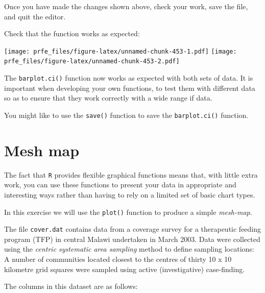\documentclass[12pt,a4paper]{book}
\newenvironment{Shaded}{\begin{snugshade}}{\end{snugshade}}
\newcommand{\KeywordTok}[1]{\textcolor[rgb]{0.13,0.29,0.53}{\textbf{#1}}}
\newcommand{\NormalTok}[1]{#1}
\newcommand{\OperatorTok}[1]{\textcolor[rgb]{0.81,0.36,0.00}{\textbf{#1}}}
\theoremstyle{definition}
\theoremstyle{definition}
\theoremstyle{definition}
\theoremstyle{remark}
\begin{document}
Once you have made the changes shown above, check your work, save the
file, and quit the editor.

Check that the function works as expected:

\begin{Shaded}
\end{Shaded}

\texttt{[image: prfe\_files/figure-latex/unnamed-chunk-453-1.pdf]}
\texttt{[image: prfe\_files/figure-latex/unnamed-chunk-453-2.pdf]}

The \texttt{barplot.ci()} function now works as expected with both sets
of data. It is important when developing your own functions, to test
them with different data so as to ensure that they work correctly with a
wide range if data.

You might like to use the \texttt{save()} function to save the
\texttt{barplot.ci()} function.

\hypertarget{mesh-map}{%
\section{Mesh map}\label{mesh-map}}

The fact that \texttt{R} provides flexible graphical functions means
that, with little extra work, you can use these functions to present
your data in appropriate and interesting ways rather than having to rely
on a limited set of basic chart types.

In this exercise we will use the \texttt{plot()} function to produce a
simple \emph{mesh-map}.

The file \texttt{cover.dat} contains data from a coverage survey for a
therapeutic feeding program (TFP) in central Malawi undertaken in March
2003. Data were collected using the \emph{centric systematic area
sampling} method to define sampling locations: A number of communities
located closest to the centres of thirty 10 x 10 kilometre grid squares
were sampled using active (investigative) case-finding.

The columns in this dataset are as follows:
\end{document}
